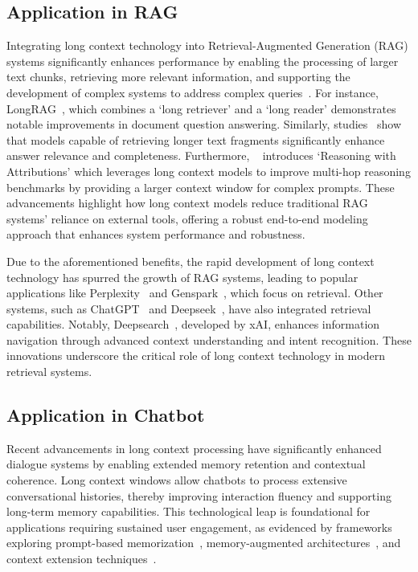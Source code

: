 \documentclass[11pt, a4paper, logo, copyright, nonumbering]{map}
\begin{document}
\subsection{Application in RAG}
Integrating long context technology into Retrieval-Augmented Generation (RAG) systems significantly enhances performance by enabling the processing of larger text chunks, retrieving more relevant information, and supporting the development of complex systems to address complex queries~\cite{yu2024defense,DBLP:journals/corr/abs-2410-05983}. For instance, LongRAG~\citep{DBLP:journals/corr/abs-2406-15319}, which combines a `long retriever' and a `long reader' demonstrates notable improvements in document question answering. Similarly, studies~\citep{DBLP:journals/corr/abs-2410-05983,DBLP:journals/corr/abs-2405-03085} show that models capable of retrieving longer text fragments significantly enhance answer relevance and completeness. Furthermore, ~\citeauthor{DBLP:conf/acl/LiLL024} introduces `Reasoning with Attributions' which leverages long context models to improve multi-hop reasoning benchmarks by providing a larger context window for complex prompts. These advancements highlight how long context models reduce traditional RAG systems' reliance on external tools, offering a robust end-to-end modeling approach that enhances system performance and robustness.

Due to the aforementioned benefits, the rapid development of long context technology has spurred the growth of RAG systems, leading to popular applications like Perplexity~\citep{perplexity_pages} and Genspark~\citep{genspark}, which focus on retrieval. Other systems, such as ChatGPT~\citep{DBLP:conf/emnlp/0001YMWRCYR23} and Deepseek~\citep{deepseek_web_2023}, have also integrated retrieval capabilities. Notably, Deepsearch~\citep{deepsearch}, developed by xAI, enhances information navigation through advanced context understanding and intent recognition. These innovations underscore the critical role of long context technology in modern retrieval systems.






\subsection{Application in Chatbot}
Recent advancements in long context processing have significantly enhanced dialogue systems by enabling extended memory retention and contextual coherence. Long context windows allow chatbots to process extensive conversational histories, thereby improving interaction fluency and supporting long-term memory capabilities. This technological leap is foundational for applications requiring sustained user engagement, as evidenced by frameworks exploring prompt-based memorization~\cite{lee-etal-2023-prompted}, memory-augmented architectures~\cite{DBLP:conf/aaai/ZhongGGYW24}, and context extension techniques~\cite{longmem,wang2024limitssurveytechniquesextend}.
\end{document}
